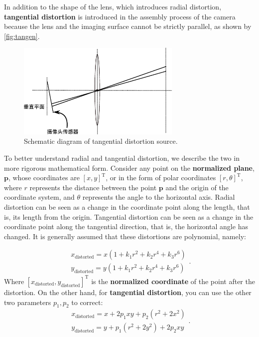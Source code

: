 In addition to the shape of the lens, which introduces radial distortion, \textbf{tangential distortion} is introduced in the assembly process of the camera because the lens and the imaging surface cannot be strictly parallel, as shown by \autoref{fig:tangen}.

\begin{figure}[!t]
	\centering
	\includegraphics[width=0.7\textwidth]{chapter05/resources/cameraModel/tangen.pdf}
	\caption{Schematic diagram of tangential distortion source.}
	\label{fig:tangen}
\end{figure}

To better understand radial and tangential distortion, we describe the two in more rigorous mathematical form. Consider any point on the \textbf{normalized plane}, $\bm{p}$, whose coordinates are $[x,y]^\mathrm{T}$, or in the form of polar coordinates $[r,\theta]^\mathrm{T}$, where $r$ represents the distance between the point $\bm{p}$ and the origin of the coordinate system, and $\theta$ represents the angle to the horizontal axis. Radial distortion can be seen as a change in the coordinate point along the length, that is, its length from the origin. Tangential distortion can be seen as a change in the coordinate point along the tangential direction, that is, the horizontal angle has changed. It is generally assumed that these distortions are polynomial, namely:

\begin{equation}
\label{eq:distortion} 
\begin{matrix}
x_\mathrm{distorted} = x(1+k_1r^2+k_2r^4+k_3r^6)\\
y_\mathrm{distorted} = y(1+k_1r^2+k_2r^4+k_3r^6)
\end{matrix}.
\end{equation}
Where $[x_\mathrm{distorted}, y_\mathrm{distorted}]^\mathrm{T}$ is the \textbf{normalized coordinate} of the point after the distortion. On the other hand, for \textbf{tangential distortion}, you can use the other two parameters $p_1,p_2$ to correct:
\begin{equation}
\label{eq:tangen} 
\begin{matrix}
x_\mathrm{distorted} = x+2p_1xy+p_2(r^2+2x^2)\\
y_\mathrm{distorted} = y+p_1(r^2+2y^2)+2p_2xy
\end{matrix}. 
\end{equation}

